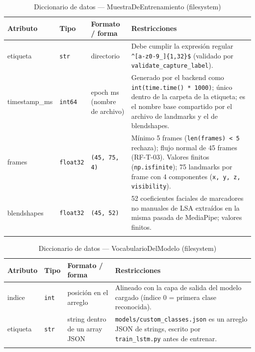 \begin{longtable}{p{2.8cm} p{2.2cm} p{3.2cm} p{5.6cm}}
    \toprule
    \textbf{Atributo} & \textbf{Tipo} & \textbf{Formato / forma} & \textbf{Restricciones} \\
    \midrule
    \endhead
    etiqueta & \texttt{str} & directorio & Debe cumplir la expresión regular
    \texttt{\textasciicircum{}[a-z0-9\_]\{1,32\}\$} (validado por
    \texttt{validate\_capture\_label}). \\

    timestamp\_ms & \texttt{int64} & epoch ms (nombre de archivo) &
    Generado por el backend como \texttt{int(time.time() * 1000)}; único
    dentro de la carpeta de la etiqueta; es el nombre base compartido por
    el archivo de landmarks y el de blendshapes. \\

    frames & \texttt{float32} & \texttt{(45, 75, 4)} & Mínimo 5 frames
    (\texttt{len(frames) < 5} rechaza); flujo normal de 45 frames (RF-T-03).
    Valores finitos (\texttt{np.isfinite}); 75 landmarks por frame
    con 4 componentes (\texttt{x, y, z, visibility}). \\

    blendshapes & \texttt{float32} & \texttt{(45, 52)} &
    52 coeficientes faciales de marcadores no manuales de LSA extraídos en la
    misma pasada de MediaPipe; valores finitos. \\
    \bottomrule
    \caption{Diccionario de datos — MuestraDeEntrenamiento (filesystem)}
    \label{tab:dat-dic-muestra}
\end{longtable}

\begin{longtable}{p{2.8cm} p{2.2cm} p{3.2cm} p{5.6cm}}
    \toprule
    \textbf{Atributo} & \textbf{Tipo} & \textbf{Formato / forma} & \textbf{Restricciones} \\
    \midrule
    \endhead
    indice & \texttt{int} & posición en el arreglo & Alineado con la capa de
    salida del modelo cargado (índice 0 = primera clase reconocida). \\

    etiqueta & \texttt{str} & string dentro de un array JSON &
    \texttt{models/custom\_classes.json} es un arreglo JSON de strings,
    escrito por \texttt{train\_lstm.py} antes de entrenar. \\
    \bottomrule
    \caption{Diccionario de datos — VocabularioDelModelo (filesystem)}
    \label{tab:dat-dic-vocabulario}
\end{longtable}

